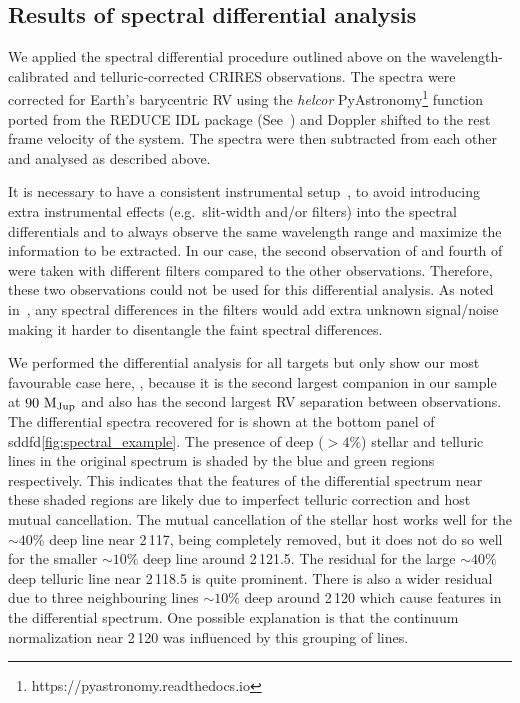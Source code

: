 \subsection{Results of spectral differential analysis}

We applied the spectral differential procedure outlined above on the wavelength-calibrated and telluric-corrected {CRIRES} observations. The spectra were corrected for Earth's barycentric {RV} using the \emph{helcor} PyAstronomy\footnote{https://pyastronomy.readthedocs.io} function ported from the REDUCE IDL package (See~\citet[][]{piskunov_new_2002}) and Doppler shifted to the rest frame velocity of the system. The spectra were then subtracted from each other and analysed as described above.

It is necessary to have a consistent instrumental setup~\citet{ferluga_separating_1997}, to avoid introducing extra instrumental effects (e.g.\ slit-width and/or filters) into the spectral differentials and to always observe the same wavelength range and maximize the information to be extracted. In our case, the second observation of  and fourth of  were taken with different filters compared to the other observations. Therefore, these two observations could not be used for this differential analysis. As noted in~\citep{hadrava_disentangling_2009}, any spectral differences in the filters would add extra unknown signal/noise making it harder to disentangle the faint spectral differences.




We performed the differential analysis for all targets but only show our most favourable case here, , because it is the second largest companion in our sample at \(\rm 90~M_{Jup}\) and also has the second largest {RV} separation between observations. The differential spectra recovered for  is shown at the bottom panel of sddfd\ref{fig:spectral_example}. The presence of deep (\(>4\%\)) stellar and telluric lines in the original spectrum is shaded by the blue and green regions respectively. This indicates that the features of the differential spectrum near these shaded regions are likely due to imperfect telluric correction and host mutual cancellation.
The mutual cancellation of the stellar host works well for the \(\sim40\%\) deep line near 2\,117\nm{}, being completely removed, but it does not do so well for the smaller \(\sim10\%\) deep line around 2\,121.5\nm{}. The residual for the large \(\sim40\%\) deep telluric line near 2\,118.5\nm{} is quite prominent. There is also a wider residual due to three neighbouring lines \(\sim10\%\) deep around 2\,120\nm{} which cause features in the differential spectrum. One possible explanation is that the continuum normalization near 2\,120\nm{} was influenced by this grouping of lines.

